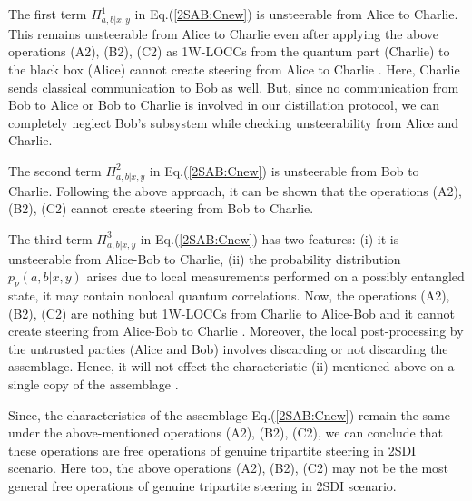 \documentclass[reprint,superscriptaddress,nofootinbib,amsmath,amssymb,aps,pra,longbibliography]{revtex4-1}
\newcommand{\blu}{\color{blue}}
\begin{document}
\begin{widetext}

The first term $\Pi^1_{a,b|x,y}$ in Eq.(\ref{2SAB:Cnew}) is unsteerable from Alice to Charlie. This remains unsteerable from Alice to Charlie even after applying the above operations (A2), (B2), (C2) \cite{Nery20} as 1W-LOCCs from the quantum part (Charlie) to the black box (Alice) cannot create steering from Alice to Charlie \cite{Rodrigo15}. Here, Charlie sends classical communication to Bob as well. But, since no communication from Bob to Alice or Bob to Charlie is involved in our distillation protocol, we can completely neglect Bob's subsystem while checking unsteerability from Alice and Charlie.


The second term $\Pi^2_{a,b|x,y}$ in Eq.(\ref{2SAB:Cnew}) is unsteerable from Bob to Charlie. Following the above approach, it can be shown that the operations (A2), (B2), (C2) cannot create steering from Bob to Charlie.

The third term $\Pi^3_{a,b|x,y}$ in Eq.(\ref{2SAB:Cnew}) has two features:  (i) it is unsteerable from Alice-Bob to  Charlie, (ii) the probability distribution $p_{\nu}(a,b|x, y)$ arises due to local measurements performed on a possibly entangled state, it may contain nonlocal quantum correlations. Now, the operations  (A2), (B2), (C2) are nothing but 1W-LOCCs from Charlie to Alice-Bob and it cannot create steering from Alice-Bob to Charlie \cite{Rodrigo15, Nery20}. Moreover, the local post-processing  by the untrusted parties (Alice and Bob) involves discarding or not discarding the assemblage. Hence, it will not effect the characteristic (ii) mentioned above on a single copy of the assemblage  \cite{Nery20}.

Since, the characteristics of the assemblage Eq.(\ref{2SAB:Cnew}) remain the same under the above-mentioned operations (A2), (B2), (C2), we can conclude that these operations are free operations of genuine tripartite steering in 2SDI scenario.
Here too, the above operations (A2), (B2), (C2) may not be the most general free operations of genuine tripartite steering in 2SDI scenario.




\end{widetext}
\end{document}
